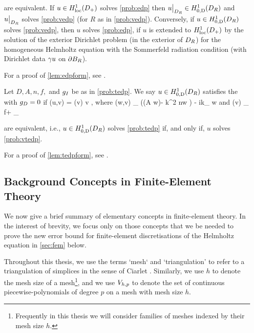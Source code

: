 \label{lem:edpform}
 are equivalent. If $u \in \HolocDp$ solves \cref{prob:edp} then $u\restrict_{\DR} \in \HozDDR$ and $u\big|_{D_{R}}$ solves \cref{prob:vedp}  (for $R$ as in \cref{prob:vedp}). Conversely, if $u \in \HozDDR$ solves \cref{prob:vedp}, then $u$ solves \cref{prob:edp}, if $u$ is extended to $\HolocDp$ by the solution of the exterior Dirichlet problem (in the exterior of $D_{R}$) for the homogeneous Helmholtz equation with the Sommerfeld radiation condition (with Dirichlet data $\gamma u$ on $\partial B_{R}$).
\ele

For a proof of \cref{lem:edpform}, see \cite[Lemma 3.3]{GrPeSp:19}.

\bprob[Variational formulation of TEDP when $\gD = 0$]\label{prob:vtedp}
Let $D, A, n, f,$ and $g_{I}$ be as in \cref{prob:tedp}. We say $u \in \HozDDR$ satisfies the  with $\gD = 0$ if
\beq\label{eq:vtedp}
\aT(u,v) = \FT(v) \tfa v \in \HozDDR,
\eeq
where
\beq\label{eq:aT}
\aT(w,v) \de \int_{\DR} \big(\mleft(A \grad w\mright)\cdot\grad \vbar - k^2 n\minispace w \vbar\big) - ik\int_{\GI} \trGI w\minispace\trGI \vbar
\eeq
and
\beqs
\FT(v) \de \int_{\DR} f\minispace\vbar + \int_{\GI} \gI \minispace\trGI \vbar
\eeqs
\eprob

\label{lem:tedpform}
 are equivalent, i.e., $u \in \HozDDR$ solves \cref{prob:tedp} if, and only if, $u$ solves \cref{prob:vtedp}.
\ele

For a proof of \cref{lem:tedpform}, see \cite[Lemma A.7]{GrPeSp:19}.
  
\subsection{Background Concepts in Finite-Element Theory}\label{sec:fetheory}

We now give a brief summary of elementary concepts in finite-element theory. In the interest of brevity, we focus only on those concepts that we be needed to
prove the new error bound for finite-element discretisations of the Helmholtz equation in \cref{sec:fem} below.

Throughout this thesis, we use the terms `mesh` and `triangulation' to refer to a triangulation of simplices in the sense of Ciarlet \cite[Paragraphs (FEM1) p. 61 and ($\cT_{h}$5) p. 71]{Ci:91}. Similarly, we use $h$ to denote the mesh size of a mesh\footnote{Frequently in this thesis we will consider families of meshes indexed by their mesh size $h$.}, and we use $V_{h,p}$ to denote the set of continuous piecewise-polynomials of degree $p$ on a mesh with mesh size $h$.

